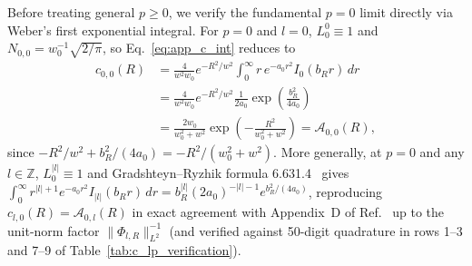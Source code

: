 \documentclass[aps,pra,onecolumn,notitlepage,11pt,tightenlines,nofootinbib,floatfix,longbibliography]{revtex4-2}
\theoremstyle{remark}
\newcommand{\norm}[1]{\lVert #1 \rVert}
\newcommand{\abs}[1]{\lvert #1 \rvert}
\begin{document}
Before treating general $p \ge 0$, we verify the fundamental $p = 0$ limit directly via Weber's first exponential integral. For $p = 0$ and $l = 0$, $L_0^0 \equiv 1$ and $N_{0,0} = w_0^{-1}\sqrt{2/\pi}$, so Eq.~\eqref{eq:app_c_int} reduces to
\begin{align}
c_{0,0}(R) &= \frac{4}{w^2 w_0} e^{-R^2/w^2} \int_0^\infty r\,e^{-a_0 r^2} I_0(b_R r)\,dr \nonumber \\
&= \frac{4}{w^2 w_0} e^{-R^2/w^2} \frac{1}{2a_0} \exp\!\left(\frac{b_R^2}{4a_0}\right) \nonumber \\
&= \frac{2w_0}{w_0^2 + w^2} \exp\!\left(-\frac{R^2}{w_0^2 + w^2}\right) = \mathcal{A}_{0,0}(R),
\label{eq:app_p0_l0_check}
\end{align}
since $-R^2/w^2 + b_R^2/(4a_0) = -R^2/(w_0^2 + w^2)$. More generally, at $p = 0$ and any $l \in \mathbb{Z}$, $L_0^{\abs{l}} \equiv 1$ and Gradshteyn--Ryzhik formula 6.631.4~\cite{Gradshteyn2014} gives $\int_0^\infty r^{\abs{l}+1} e^{-a_0 r^2} I_{\abs{l}}(b_R r)\,dr = b_R^{\abs{l}} (2 a_0)^{-\abs{l}-1} e^{b_R^2/(4a_0)}$, reproducing $c_{l,0}(R) = \mathcal{A}_{0,l}(R)$ in exact agreement with Appendix~D of Ref.~\cite{Ferreira2026} up to the unit-norm factor $\norm{\Phi_{l,R}}_{L^2}^{-1}$ (and verified against 50-digit quadrature in rows 1--3 and 7--9 of Table~\ref{tab:c_lp_verification}).
\end{document}
